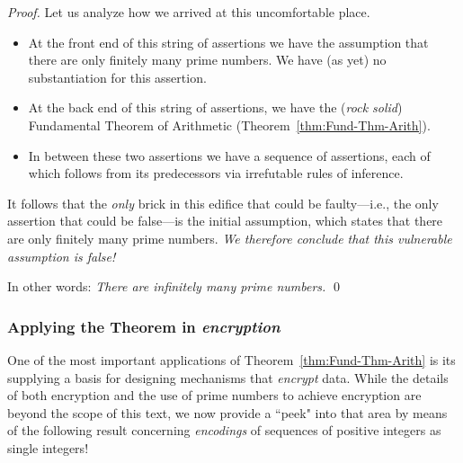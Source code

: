\begin{proof}
\medskip

Let us analyze how we arrived at this uncomfortable place.
\begin{itemize}
\item
At the front end of this string of assertions we have the assumption that there are only finitely many prime numbers.  We have (as yet) no substantiation for this assertion.
\item
At the back end of this string of assertions, we have the ({\em rock solid}) Fundamental Theorem of Arithmetic (Theorem~\ref{thm:Fund-Thm-Arith}).
\item
In between these two assertions we have a sequence of assertions, each of which follows from its predecessors via irrefutable rules of inference.
\end{itemize}
It follows that the {\em only} brick in this edifice that could be faulty---i.e., the only assertion that could be false---is the initial assumption, which states that there are only finitely many prime
numbers.  {\em We therefore conclude that this vulnerable assumption is false!} 

\smallskip

In other words: {\em There are infinitely many prime numbers.}  \qed
\end{proof}


\subsubsection{Applying the Theorem in {\em encryption}}
\label{sec:apply-FTA}

One of the most important applications of Theorem~\ref{thm:Fund-Thm-Arith} is its supplying a basis for designing mechanisms that {\em encrypt} data.  While the details of both encryption and the use of prime numbers to achieve encryption are beyond the scope of this text, we now provide a ``peek" into that area by means of the following result concerning {\it encodings} of sequences of positive integers as single integers!

\bigskip

\noindent {}

